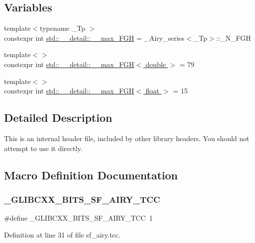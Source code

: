 \subsection*{Variables}
\begin{DoxyCompactItemize}
\item 
{\footnotesize template$<$typename \+\_\+\+Tp $>$ }\\constexpr int \hyperlink{namespacestd_1_1____detail_ae3ef7007b55cd83fa162820c809a2995}{std\+::\+\_\+\+\_\+detail\+::\+\_\+\+\_\+max\+\_\+\+F\+GH} = \+\_\+\+Airy\+\_\+series$<$\+\_\+\+Tp$>$\+::\+\_\+\+N\+\_\+\+F\+GH
\item 
{\footnotesize template$<$$>$ }\\constexpr int \hyperlink{namespacestd_1_1____detail_ac945c3d1897eb356e75d379f67367a4b}{std\+::\+\_\+\+\_\+detail\+::\+\_\+\+\_\+max\+\_\+\+F\+G\+H$<$ double $>$} = 79
\item 
{\footnotesize template$<$$>$ }\\constexpr int \hyperlink{namespacestd_1_1____detail_a67195934ce49105fd7b765e669a5a2a0}{std\+::\+\_\+\+\_\+detail\+::\+\_\+\+\_\+max\+\_\+\+F\+G\+H$<$ float $>$} = 15
\end{DoxyCompactItemize}


\subsection{Detailed Description}
This is an internal header file, included by other library headers. You should not attempt to use it directly. 

\subsection{Macro Definition Documentation}
\mbox{\label{sf__airy_8tcc_a2368d5b1edfb2e14f2c283d87ab89943}} 
\subsubsection{\texorpdfstring{\+\_\+\+G\+L\+I\+B\+C\+X\+X\+\_\+\+B\+I\+T\+S\+\_\+\+S\+F\+\_\+\+A\+I\+R\+Y\+\_\+\+T\+CC}{\_GLIBCXX\_BITS\_SF\_AIRY\_TCC}}
{\footnotesize\ttfamily \#define \+\_\+\+G\+L\+I\+B\+C\+X\+X\+\_\+\+B\+I\+T\+S\+\_\+\+S\+F\+\_\+\+A\+I\+R\+Y\+\_\+\+T\+CC~1}



Definition at line 31 of file sf\+\_\+airy.\+tcc.

